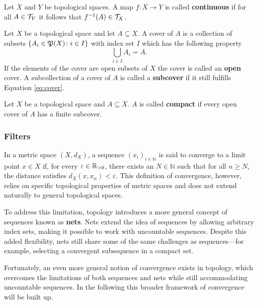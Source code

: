 \begin{defin}
  Let $X$ and $Y$ be topological spaces. A map $f\colon X \to Y$ is called \textbf{continuous} if for all $A \in \mathcal{T}_Y$ it follows that $f^{-1}(A) \in \mathcal{T}_X$.  
\end{defin}

\begin{defin}
  Let $X$ be a topological space and let $A \subseteq X$. A cover of $A$ is a collection of subsets $\left\{A_i \in \mathfrak{P}(X)\colon i \in I \right\}$ with index set $I$ which has the following property
  \begin{equation}\label{eq:cover}
    \bigcup\limits_{i\in I}A_i = A.
  \end{equation}
  If the elements of the cover are open subsets of $X$ the cover is called an \textbf{open} cover.
  A subcollection of a cover of $A$ is called a \textbf{subcover} if it still fulfills Equation \ref{eq:cover}.
\end{defin}

\begin{defin}
  Let $X$ be a topological space and $A \subseteq X$. $A$ is called \textbf{compact} if every open cover of $A$ has a finite subcover. 
\end{defin}

\subsubsection{Filters}
In a metric space \((X, d_X)\), a sequence \((x_i)_{i \in \mathbb{N}}\) is said to converge to a limit point \(x \in X\) if, for every \(\varepsilon \in \mathbb{R}_{>0}\), there exists an \(N \in \mathbb{N}\) such that for all \(n \geq N\), the distance satisfies \(d_X(x, x_n) < \varepsilon\). This definition of convergence, however, relies on specific topological properties of metric spaces and does not extend naturally to general topological spaces. 

To address this limitation, topology introduces a more general concept of sequences known as \textbf{nets}. Nets extend the idea of sequences by allowing arbitrary index sets, making it possible to work with uncountable sequences. Despite this added flexibility, nets still share some of the same challenges as sequences—for example, selecting a convergent subsequence in a compact set.

Fortunately, an even more general notion of convergence exists in topology, which overcomes the limitations of both sequences and nets while still accommodating uncountable sequences. In the following this broader framework of convergence will be built up.

